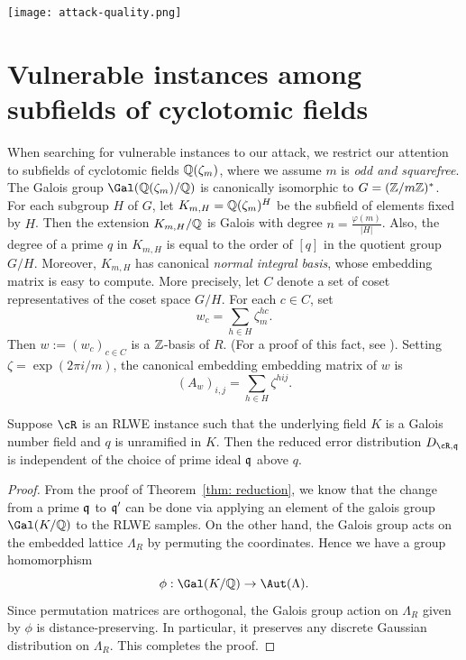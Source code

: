 \documentclass{amsart}
\begin{document}
\begin{center}
\texttt{[image: attack-quality.png]}
\end{center}

\section{Vulnerable instances among subfields of cyclotomic fields}\label{sec: sub-cyclotomics}

When searching for vulnerable instances to our attack, we restrict our attention to subfields of cyclotomic fields $\mathbb{Q}(\zeta_m)$, where we assume $m$ is {\it odd and squarefree}. The Galois group $\Gal(\bQ(\zeta_m)/\bQ)$ is canonically isomorphic to $G = (\mathbb{Z}/m\mathbb{Z})^*$. For each subgroup $H$ of $G$, let $K_{m,H} = \mathbb{Q}(\zeta_m)^H$ be the subfield of elements fixed by $H$.
Then the extension $K_{m,H}/\mathbb{Q}$ is Galois with degree $n = \frac{\varphi(m)}{|H|}$. Also, the degree of a prime $q$ in $K_{m,H}$ is equal to the order of $[q]$ in the quotient group $G/H$. Moreover, $K_{m,H}$ has canonical {\it normal integral basis}, whose embedding matrix is easy to compute. More precisely, let $C$ denote a set of coset representatives of the coset space $G/H$. For each $c \in C$, set
\[
    w_c =  \sum_{h \in H} \zeta_m^{hc}.
\]
Then  $w := (w_c)_{c \in C}$ is a $\mathbb{Z}$-basis of $R$. (For a proof of this fact, see \cite[Proposition 6.1]{johnston2011notes}). Setting $\zeta = \exp(2\pi i /m)$, the canonical embedding embedding matrix of $w$ is
\[
    (A_w)_{i,j} = \sum_{h \in H}{\zeta^{hij}}.
\]

\begin{Lemma} \label{lem: symmetry}
Suppose $\cR$ is an RLWE instance such that the underlying field $K$ is a Galois number field and $q$ is unramified in $K$. Then the reduced error distribution $D_{\cR,\fq}$ is independent of the choice of prime ideal $\mathfrak{q}$ above $q$.
\end{Lemma}

\begin{proof}
From the proof of Theorem~\ref{thm: reduction}, we know that the change from a prime $\mathfrak{q}$ to $\mathfrak{q}'$ can be done via applying an element of the galois group $\Gal(K/\bQ)$ to the RLWE samples. On the other hand, the Galois group acts on the embedded lattice $\Lambda_R$ by permuting the coordinates. Hence we have a group homomorphism $$\phi: \Gal(K/\bQ) \to \Aut(\Lambda).$$ Since permutation matrices are orthogonal, the Galois group action on $\Lambda_R$ given by $\phi$ is distance-preserving. In particular, it preserves any discrete Gaussian distribution on $\Lambda_R$. This completes the proof.
\end{proof}
\end{document}
